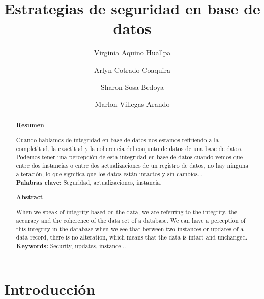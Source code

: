 \documentclass[%
 reprint,
 amsmath,amssymb,
 aps,
]{revtex4-1}
\begin{document}
\title{Estrategias de seguridad en base de datos}
\author{Virginia Aquino Huallpa}
\author{Arlyn Cotrado Coaquira}
\author{Sharon Sosa Bedoya}
\author{Marlon Villegas Arando}
%

\begin{abstract}
\begin{center}
\textbf{Resumen}
\end{center}

Cuando hablamos de integridad en base de datos nos estamos refiriendo a la completitud, la exactitud y la coherencia del conjunto de datos de una base de datos. Podemos tener una percepción de esta integridad en base de datos cuando vemos que entre dos instancias o entre dos actualizaciones de un registro de datos, no hay ninguna alteración, lo que significa que los datos están intactos y sin cambios...\\

\textbf{Palabras clave:}   Seguridad, actualizaciones, instancia.\\

\begin{center}
\textbf{Abstract}
\end{center}
When we speak of integrity based on the data, we are referring to the integrity, the accuracy and the coherence of the data set of a database. We can have a perception of this integrity in the database when we see that between two instances or updates of a data record, there is no alteration, which means that the data is intact and unchanged.\\
\textbf{Keywords:}   Security, updates, instance...\\

\end{abstract}



\maketitle


\section {Introducción}\label{sec:1}
\end{document}
